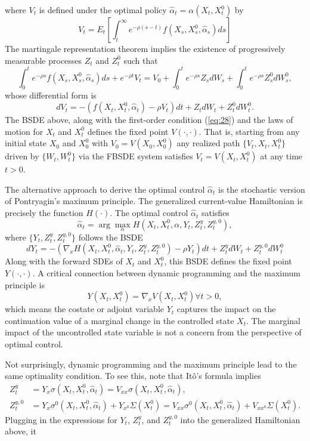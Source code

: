\documentclass{article}
\begin{document}
where $V_{t}$ is defined under the optimal policy $\hat{\alpha}_{t}=\alpha(X_{t},X_{t}^{0})$ by
\[
V_{t}=E_{t}\left[\int_{t}^{\infty}e^{-\rho(s-t)}f(X_{s},X_{s}^{0},\hat{\alpha}_{s})ds\right]
\]
The martingale representation theorem implies the existence of progressively measurable processes $Z_{t}$ and $Z_{t}^{0}$ such that
\[
\int_{0}^{t}e^{-\rho s}f(X_{s},X_{s}^{0},\hat{\alpha}_{s})ds+e^{-\rho t}V_{t}=V_{0}+\int_{0}^{t}e^{-\rho s}Z_{s}dW_{s}+\int_{0}^{t}e^{-\rho s}Z_{s}^{0}dW_{s}^{0},
\]
whose differential form is
\[
dV_{t}=-(f(X_{t},X_{t}^{0},\hat{\alpha}_{t})-\rho V_{t})dt+Z_{t}dW_{t}+Z_{t}^{0}dW_{t}^{0}.
\]
The BSDE above, along with the first-order condition (\ref{eq:28}) and the laws of motion for $X_{t}$ and $X_{t}^{0}$ defines the fixed point $V(\cdot,\cdot)$. That is, starting from any initial state $X_{0}$ and $X_{0}^{0}$ with $V_{0}=V(X_{0},X_{0}^{0})$ any realized path $\{V_{t},X_{t},X_{t}^{0}\}$ driven by $\{W_{t},W_{t}^{0}\}$ via the FBSDE system satisfies $V_{t}=V(X_{t},X_{t}^{0})$ at any time $t>0$.

The alternative approach to derive the optimal control $\hat{\alpha}_{t}$ is the stochastic version of Pontryagin's maximum principle. The generalized current-value Hamiltonian is precisely the function $H(\cdot)$. The optimal control $\hat{\alpha}_{t}$ satisfies
\[
\hat{\alpha}_{t}=\arg\max_{\alpha}H(X_{t},X_{t}^{0},\alpha,Y_{t},Z_{t}^{y},Z_{t}^{y,0}),
\]
where $\{Y_{t},Z_{t}^{y},Z_{t}^{y,0}\}$ follows the BSDE
\[
dY_{t}=-(\nabla_{x}H(X_{t},X_{t}^{0},\hat{\alpha}_{t},Y_{t},Z_{t}^{y},Z_{t}^{y,0})-\rho Y_{t})dt+Z_{t}^{y}dW_{t}+Z_{t}^{y,0}dW_{t}^{0}
\]
Along with the forward SDEs of $X_{t}$ and $X_{t}^{0}$, this BSDE defines the fixed point $Y(\cdot,\cdot)$. A critical connection between dynamic programming and the maximum principle is
\[
Y(X_{t},X_{t}^{0})=\nabla_{x}V(X_{t},X_{t}^{0})\forall t>0,
\]
which means the costate or adjoint variable $Y_{t}$ captures the impact on the continuation value of a marginal change in the controlled state $X_{t}$. The marginal impact of the uncontrolled state variable is not a concern from the perspective of optimal control.

Not surprisingly, dynamic programming and the maximum principle lead to the same optimality condition. To see this, note that Itô's formula implies
\begin{align*}
Z_{t}^{y}&=Y_{x}\sigma(X_{t},X_{t}^{0},\hat{\alpha}_{t})=V_{xx}\sigma(X_{t},X_{t}^{0},\hat{\alpha}_{t}), \\
Z_{t}^{y,0}&=Y_{x}\sigma^{0}(X_{t},X_{t}^{0},\hat{\alpha}_{t})+Y_{x^{0}}\Sigma(X_{t}^{0})=V_{xx}\sigma^{0}(X_{t},X_{t}^{0},\hat{\alpha}_{t})+V_{xx^{0}}\Sigma(X_{t}^{0}).
\end{align*}
Plugging in the expressions for $Y_{t}$, $Z_{t}^{y}$, and $Z_{t}^{y,0}$ into the generalized Hamiltonian above, it
\end{document}
